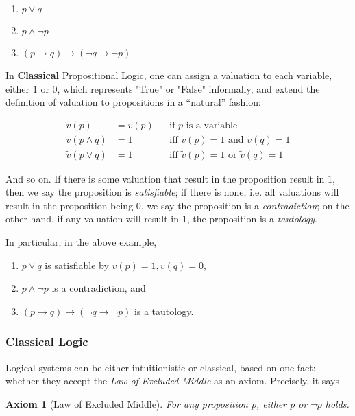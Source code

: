 \begin{enumerate}
    \item $p\vee q$
    \item $p\wedge \neg p$
    \item $(p\to q)\to (\neg q\to\neg p)$
\end{enumerate}

In \textbf{Classical} Propositional Logic, one can assign a valuation to each variable,
either $1$ or $0$, which represents "True" or "False" informally, and extend the
definition of valuation to propositions in a ``natural'' fashion: 

\begin{align*}
\tilde{v}(p)&=v(p)&&\text{if $p$ is a variable}\\
\tilde{v}(p\wedge q)&=1&&\text{iff }\tilde{v}(p) = 1 \text{ and } \tilde{v}(q) = 1\\
\tilde{v}(p\vee q)&=1&&\text{iff }\tilde{v}(p) = 1 \text{ or } \tilde{v}(q) = 1
\end{align*}

And so on. If there is some valuation that result in the proposition result in
$1$, then we say the proposition is \emph{satisfiable}; if there is none, i.e.
all valuations will result in the proposition being $0$, we say the proposition
is a \emph{contradiction}; on the other hand, if any valuation will result in
$1$, the proposition is a \emph{tautology}.

In particular, in the above example, 

\begin{enumerate}
    \item $p\vee q$ is satisfiable by $v(p)=1, v(q)=0$,
    \item $p\wedge \neg p$ is a contradiction, and 
    \item $(p\to q)\to (\neg q\to\neg p)$ is a tautology.
\end{enumerate}

\subsubsection{Classical Logic} Logical systems can be either intuitionistic or
classical, based on one fact: whether they accept the \emph{Law of Excluded
Middle} as an axiom. Precisely, it says

\newtheorem{axiom}{Axiom}[section]
\begin{axiom}[Law of Excluded Middle]
    For any proposition $p$, either $p$ or $\neg p$ holds.
\end{axiom}

